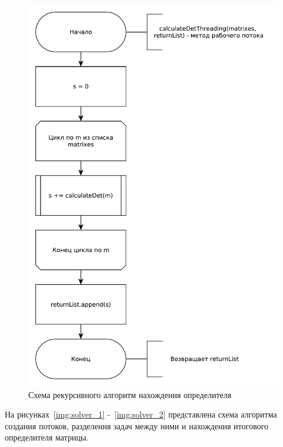 \documentclass[a4paper,oneside,14pt]{extreport}
\begin{document}
\begin{figure}[H]
	\centering
	\includegraphics[width=0.85\linewidth]{images/thread_schema}
	\caption{Схема рекурсивного алгоритм нахождения определителя}
	\label{img:thread_schema}
\end{figure}

На рисунках~\ref{img:solver_1} -~\ref{img:solver_2} представлена схема алгоритма создания потоков,
разделения задач между ними и нахождения итогового определителя матрицы.
\end{document}
